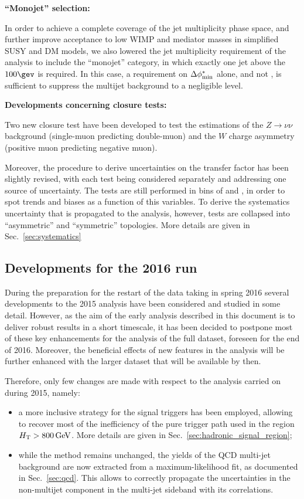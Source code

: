 {\bf ``Monojet'' selection:}

In order to achieve a complete coverage of the jet multiplicity phase space,
and further improve acceptance to low WIMP and mediator masses
in simplified SUSY and DM models, we also lowered the jet multiplicity 
requirement of the analysis to include the ``monojet'' category, in which
exactly one jet above the $100\gev$ is required. In this case, a requirement on
$\mbox{$\Delta\phi^{*}_{\rm min}$}$ alone, and not \alphat, is sufficient to suppress the multijet
background to a negligible level.


{\bf Developments concerning closure tests:}

Two new closure test have been developed to test the estimations of the $Z \to \nu \nu$
background (single-muon predicting double-muon) and the $W$ charge asymmetry (positive muon predicting negative muon). 

Moreover, the procedure to derive uncertainties on the transfer factor has been slightly revised, 
with each test being considered separately and addressing one source of uncertainty. 
The tests are still performed in bins of \nj and \scalht, 
in order to spot trends and biases as a function of this variables. 
To derive the systematics uncertainty that is propagated to the analysis, however, 
tests are collapsed into ``asymmetric'' and ``symmetric'' topologies. 
More details are given in Sec.~\ref{sec:systematics}


\subsection{Developments for the 2016 run \label{sec:devs_2016}}
During the preparation for the restart of the data taking in spring 2016 
several developments to the 2015 analysis have been considered and studied in some detail. 
However, as the aim of the early analysis described in this document is to deliver 
robust results in a short timescale, it has been decided to postpone most of these key enhancements 
for the analysis of the full dataset, foreseen for the end of 2016. 
Moreover, the beneficial effects of new features in the analysis will be further enhanced 
with the larger dataset that will be available by then. 

Therefore, only few changes are made with respect to the analysis carried on during 2015, namely:
\begin{itemize}
\item a more inclusive strategy for the signal triggers has been employed, allowing to recover most of the inefficiency 
of the pure \scalht trigger path used in the region $\mbox{$H_\text{T}$} > 800 \,\mathrm{GeV}$. More details are given in Sec.~\ref{sec:hadronic_signal_region};
\item while the method remains unchanged, the yields of the QCD multi-jet background are now extracted from a maximum-likelihood fit, as documented in Sec.~\ref{sec:qcd}. 
This allows to correctly propagate the uncertainties in the non-multijet component in the multi-jet sideband with its correlations. 
\end{itemize}


